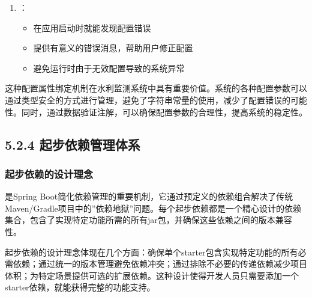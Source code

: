 \begin{enumerate}
  \begin{itemize}
  \tightlist
  \item
    每个配置项都提供了合理的默认值
  \item
    确保即使用户不提供配置，系统也能正常运行
  \item
    默认值应该是生产环境可接受的安全值
  \end{itemize}
\item
  ：

  \begin{itemize}
  \tightlist
  \item
    在应用启动时就能发现配置错误
  \item
    提供有意义的错误消息，帮助用户修正配置
  \item
    避免运行时由于无效配置导致的系统异常
  \end{itemize}
\end{enumerate}

这种配置属性绑定机制在水利监测系统中具有重要价值。系统的各种配置参数可以通过类型安全的方式进行管理，避免了字符串常量的使用，减少了配置错误的可能性。同时，通过数据验证注解，可以确保配置参数的合理性，提高系统的稳定性。

\hypertarget{ux8d77ux6b65ux4f9dux8d56ux7ba1ux7406ux4f53ux7cfb}{%
\subsection{5.2.4 起步依赖管理体系}\label{ux8d77ux6b65ux4f9dux8d56ux7ba1ux7406ux4f53ux7cfb}}

\hypertarget{ux8d77ux6b65ux4f9dux8d56ux7684ux8bbeux8ba1ux7406ux5ff5}{%
\subsubsection{起步依赖的设计理念}\label{ux8d77ux6b65ux4f9dux8d56ux7684ux8bbeux8ba1ux7406ux5ff5}}

是Spring Boot简化依赖管理的重要机制，它通过预定义的依赖组合解决了传统Maven/Gradle项目中的''依赖地狱''问题。每个起步依赖都是一个精心设计的依赖集合，包含了实现特定功能所需的所有jar包，并确保这些依赖之间的版本兼容性。

起步依赖的设计理念体现在几个方面：确保单个starter包含实现特定功能的所有必需依赖；通过统一的版本管理避免依赖冲突；通过排除不必要的传递依赖减少项目体积；为特定场景提供可选的扩展依赖。这种设计使得开发人员只需要添加一个starter依赖，就能获得完整的功能支持。

